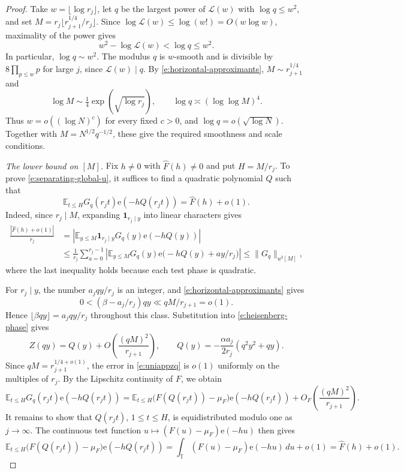 \documentclass[12pt]{amsart}
\newcommand{\1}{\mathbf 1}
\newcommand{\e}{\mathrm e}
\theoremstyle{definition}
\begin{document}
\begin{proof}
Take \(w=\lfloor\log r_j\rfloor\), let \(q\) be the largest
power of \(\mathcal L(w)\) with \(\log q\leq w^2\), and set
\(M=r_j\lfloor r_{j+1}^{1/4}/r_j\rfloor\). Since
\(\log\mathcal L(w)\leq\log(w!)=O(w\log w)\), maximality of
the power gives
\[
 w^2-\log\mathcal L(w)<\log q\leq w^2.
\]
In particular, \(\log q\sim w^2\). The modulus \(q\) is
\(w\)-smooth and is divisible by \(8\prod_{p\leq w}p\) for
large \(j\), since \(\mathcal L(w)\mid q\). By
\eqref{e:horizontal-approximants}, \(M\sim r_{j+1}^{1/4}\) and
\[
 \log M\sim \tfrac14\exp(\sqrt{\log r_j}),
 \qquad \log q\asymp(\log\log M)^4.
\]
Thus \(w=o((\log N)^c)\) for every fixed \(c>0\), and
\(\log q=o(\sqrt{\log N})\). Together with
\(M=N^{1/2}q^{-1/2}\), these give the required smoothness and
scale conditions.

\medskip
\noindent\emph{The lower bound on \([M]\).}
Fix \(h\ne0\) with \(\widehat F(h)\ne0\) and put \(H=M/r_j\).
To prove \eqref{e:separating-global-u}, it suffices to find a
quadratic polynomial \(Q\) such that
\[
 \mathbb E_{t\leq H}G_q(r_jt)\e(-hQ(r_jt))
 =\widehat F(h)+o(1).
\]
Indeed, since \(r_j\mid M\), expanding \(\mathbf1_{r_j\mid y}\)
into linear characters gives
\[
\begin{aligned}
 \frac{|\widehat F(h)+o(1)|}{r_j}
 &=\left|\mathbb E_{y\leq M}
    \mathbf1_{r_j\mid y}G_q(y)\e(-hQ(y))\right|\\
 &\leq \frac1{r_j}\sum_{a=0}^{r_j-1}
    \left|\mathbb E_{y\leq M}
     G_q(y)\e\bigl(-hQ(y)+ay/r_j\bigr)\right|\leq \|G_q\|_{u^3[M]},
\end{aligned}
\]
where the last inequality holds because each test phase is quadratic.

For \(r_j\mid y\), the number \(a_jqy/r_j\) is an integer, and
\eqref{e:horizontal-approximants} gives
\[0<(\beta-a_j/r_j)qy\ll qM/r_{j+1}=o(1).\] Hence
\(\lfloor\beta qy\rfloor=a_jqy/r_j\) throughout this class.
Substitution into \eqref{e:heisenberg-phase} gives
\begin{equation}\label{e:uniappzq}
 Z(qy)=Q(y)+O\!\left(\frac{(qM)^2}{r_{j+1}}\right),
 \qquad
 Q(y)=-\frac{\alpha a_j}{2r_j}(q^2y^2+qy).
\end{equation}
Since $qM=r_{j+1}^{1/4+o(1)}$, the error in
\eqref{e:uniappzq} is $o(1)$ uniformly on the multiples of $r_j$.
 By the Lipschitz continuity of \(F\), we obtain
\[
 \mathbb E_{t\leq H}G_q(r_jt)\e(-hQ(r_jt))
 =
 \mathbb E_{t\leq H}
   \bigl(F(Q(r_jt))-\mu_F\bigr)\e(-hQ(r_jt))
 +O_F\!\left(\frac{(qM)^2}{r_{j+1}}\right).
\]
It remains to show that \(Q(r_jt)\), \(1\leq t\leq H\), is
equidistributed modulo one as \(j\to\infty\). The continuous test
function \(u\mapsto(F(u)-\mu_F)\e(-hu)\) then gives
\[
 \mathbb E_{t\leq H}
   \bigl(F(Q(r_jt))-\mu_F\bigr)\e(-hQ(r_jt))
 =\int_{\mathbb T}(F(u)-\mu_F)\e(-hu)\,du+o(1)
 =\widehat F(h)+o(1).
\]


\end{proof}
\end{document}
